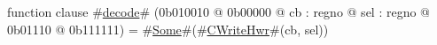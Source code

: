 function clause #\hyperref[zdecode]{decode}# (0b010010 @ 0b00000 @ cb : regno @ sel : regno @   0b01110 @ 0b111111) = #\hyperref[zSome]{Some}#(#\hyperref[zCWriteHwr]{CWriteHwr}#(cb, sel))
